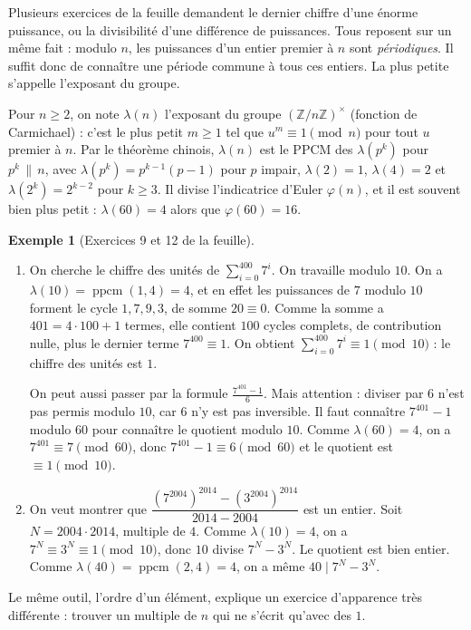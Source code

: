 \documentclass[11pt,a4paper]{article}
\theoremstyle{plain}
\theoremstyle{definition}
\newtheorem{exemple}[theoreme]{Exemple}
\theoremstyle{remark}
\newcommand{\Z}{\mathbb{Z}}
\begin{document}
Plusieurs exercices de la feuille demandent le dernier chiffre d'une énorme puissance, ou la divisibilité d'une différence de puissances. Tous reposent sur un même fait : modulo $n$, les puissances d'un entier premier à $n$ sont \emph{périodiques}. Il suffit donc de connaître une période commune à tous ces entiers. La plus petite s'appelle l'exposant du groupe.

Pour $n\geq2$, on note $\lambda(n)$ l'exposant du groupe $(\Z/n\Z)^\times$ (fonction de Carmichael) : c'est le plus petit $m\geq1$ tel que $u^m\equiv1\pmod n$ pour tout $u$ premier à $n$. Par le théorème chinois, $\lambda(n)$ est le PPCM des $\lambda(p^k)$ pour $p^k\,\|\,n$, avec $\lambda(p^k)=p^{k-1}(p-1)$ pour $p$ impair, $\lambda(2)=1$, $\lambda(4)=2$ et $\lambda(2^k)=2^{k-2}$ pour $k\geq3$. Il divise l'indicatrice d'Euler $\varphi(n)$, et il est souvent bien plus petit : $\lambda(60)=4$ alors que $\varphi(60)=16$.

\begin{exemple}[Exercices 9 et 12 de la feuille]
\begin{enumerate}[nosep]
\item On cherche le chiffre des unités de $\sum_{i=0}^{400}7^i$. On travaille modulo $10$. On a $\lambda(10)=\operatorname{ppcm}(1,4)=4$, et en effet les puissances de $7$ modulo $10$ forment le cycle $1,7,9,3$, de somme $20\equiv0$. Comme la somme a $401=4\cdot100+1$ termes, elle contient $100$ cycles complets, de contribution nulle, plus le dernier terme $7^{400}\equiv1$. On obtient $\sum_{i=0}^{400}7^i\equiv1\pmod{10}$ : le chiffre des unités est $1$.

On peut aussi passer par la formule $\frac{7^{401}-1}{6}$. Mais attention : diviser par $6$ n'est pas permis modulo $10$, car $6$ n'y est pas inversible. Il faut connaître $7^{401}-1$ modulo $60$ pour connaître le quotient modulo $10$. Comme $\lambda(60)=4$, on a $7^{401}\equiv7\pmod{60}$, donc $7^{401}-1\equiv6\pmod{60}$ et le quotient est $\equiv1\pmod{10}$.
\item On veut montrer que $\dfrac{(7^{2004})^{2014}-(3^{2004})^{2014}}{2014-2004}$ est un entier. Soit $N=2004\cdot2014$, multiple de $4$. Comme $\lambda(10)=4$, on a $7^N\equiv3^N\equiv1\pmod{10}$, donc $10$ divise $7^N-3^N$. Le quotient est bien entier. Comme $\lambda(40)=\operatorname{ppcm}(2,4)=4$, on a même $40\mid 7^N-3^N$.
\end{enumerate}
\end{exemple}

Le même outil, l'ordre d'un élément, explique un exercice d'apparence très différente : trouver un multiple de $n$ qui ne s'écrit qu'avec des $1$.
\end{document}
